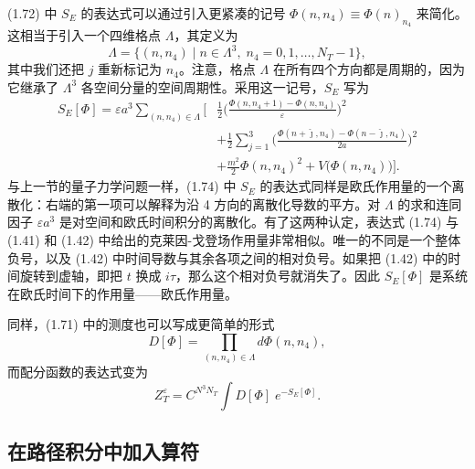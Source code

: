 (1.72) 中 $S_E$ 的表达式可以通过引入更紧凑的记号 $\Phi(n, n_4) \equiv \Phi(n)_{n_4}$ 来简化。这相当于引入一个四维格点 $\Lambda$，其定义为
\begin{equation}
  \Lambda = \big\{(n, n_4)\;\big|\; n\in\Lambda^3,\;
    n_4 = 0, 1, \ldots, N_T - 1\big\},
\end{equation}
其中我们还把 $j$ 重新标记为 $n_4$。注意，格点 $\Lambda$ 在所有四个方向都是周期的，因为它继承了 $\Lambda^3$ 各空间分量的空间周期性。采用这一记号，$S_E$ 写为
\begin{equation}
  \begin{split}
    S_E[\Phi] = \varepsilon a^3\sum_{(n,n_4)\in\Lambda}\Big[
    &\frac{1}{2}\Big(\frac{\Phi(n,n_4+1) - \Phi(n,n_4)}{\varepsilon}\Big)^2\\
    &+ \frac{1}{2}\sum_{j=1}^3
      \Big(\frac{\Phi(n+\hat{\jmath},n_4) - \Phi(n-\hat{\jmath},n_4)}{2a}\Big)^2\\
    &+ \frac{m^2}{2}\Phi(n,n_4)^2 + V\big(\Phi(n,n_4)\big)\Big].
  \end{split}
\end{equation}
与上一节的量子力学问题一样，(1.74) 中 $S_E$ 的表达式同样是欧氏作用量的一个离散化：右端的第一项可以解释为沿 4 方向的离散化导数的平方。对 $\Lambda$ 的求和连同因子 $\varepsilon a^3$ 是对空间和欧氏时间积分的离散化。有了这两种认定，表达式 (1.74) 与 (1.41) 和 (1.42) 中给出的克莱因-戈登场作用量非常相似。唯一的不同是一个整体负号，以及 (1.42) 中时间导数与其余各项之间的相对负号。如果把 (1.42) 中的时间旋转到虚轴，即把 $t$ 换成 $i\tau$，那么这个相对负号就消失了。因此 $S_E[\Phi]$ 是系统在欧氏时间下的作用量——欧氏作用量。

同样，(1.71) 中的测度也可以写成更简单的形式
\begin{equation}
  D[\Phi] = \prod_{(n,n_4)\in\Lambda}d\Phi(n,n_4),
\end{equation}
而配分函数的表达式变为
\begin{equation}
  Z_T^\varepsilon = C^{N^3N_T}\int D[\Phi]\;e^{-S_E[\Phi]}.
\end{equation}

\subsection{在路径积分中加入算符}

